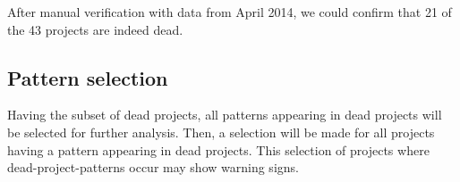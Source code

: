 After manual verification with data from April 2014, we could confirm that 21
of the 43 projects are indeed dead.

\subsection{Pattern selection}
Having the subset of dead projects, all patterns appearing in dead projects
will be selected for further analysis. Then, a selection will be made for all
projects having a pattern appearing in dead projects. This selection of
projects where dead-project-patterns occur may show warning signs.

\begin{comment}
- Execution of the research
- Phases, steps

This chapter reports on the execution of the research method as described in Chapter 3.

If the research has been divided into phases (e.g., using sub questions) the
phases are introduced, reported on and concluded individually. If needed this
Chapter could be split up to balance out the sizes of all Chapters.
An example Research Chapter is provided as Chapter 3 at Paul’s home
page\footnote{http://homepages.cwi.nl/~paulk/thesesMasterSoftwareEngineering/2006/ReneWiegers.pdf}.
\end{comment}

